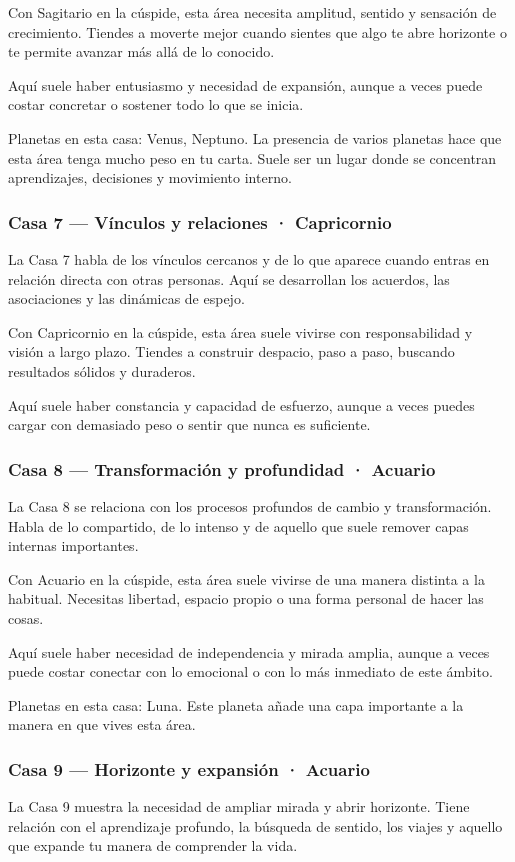 \documentclass[11pt,a4paper]{article}
\begin{document}
Con Sagitario en la cúspide, esta área necesita amplitud, sentido y sensación de crecimiento. Tiendes a moverte mejor cuando sientes que algo te abre horizonte o te permite avanzar más allá de lo conocido.

Aquí suele haber entusiasmo y necesidad de expansión, aunque a veces puede costar concretar o sostener todo lo que se inicia.

Planetas en esta casa: Venus, Neptuno. La presencia de varios planetas hace que esta área tenga mucho peso en tu carta. Suele ser un lugar donde se concentran aprendizajes, decisiones y movimiento interno.

\subsubsection*{Casa 7 — Vínculos y relaciones · Capricornio}
La Casa 7 habla de los vínculos cercanos y de lo que aparece cuando entras en relación directa con otras personas. Aquí se desarrollan los acuerdos, las asociaciones y las dinámicas de espejo.

Con Capricornio en la cúspide, esta área suele vivirse con responsabilidad y visión a largo plazo. Tiendes a construir despacio, paso a paso, buscando resultados sólidos y duraderos.

Aquí suele haber constancia y capacidad de esfuerzo, aunque a veces puedes cargar con demasiado peso o sentir que nunca es suficiente.

\subsubsection*{Casa 8 — Transformación y profundidad · Acuario}
La Casa 8 se relaciona con los procesos profundos de cambio y transformación. Habla de lo compartido, de lo intenso y de aquello que suele remover capas internas importantes.

Con Acuario en la cúspide, esta área suele vivirse de una manera distinta a la habitual. Necesitas libertad, espacio propio o una forma personal de hacer las cosas.

Aquí suele haber necesidad de independencia y mirada amplia, aunque a veces puede costar conectar con lo emocional o con lo más inmediato de este ámbito.

Planetas en esta casa: Luna. Este planeta añade una capa importante a la manera en que vives esta área.

\subsubsection*{Casa 9 — Horizonte y expansión · Acuario}
La Casa 9 muestra la necesidad de ampliar mirada y abrir horizonte. Tiene relación con el aprendizaje profundo, la búsqueda de sentido, los viajes y aquello que expande tu manera de comprender la vida.
\end{document}
